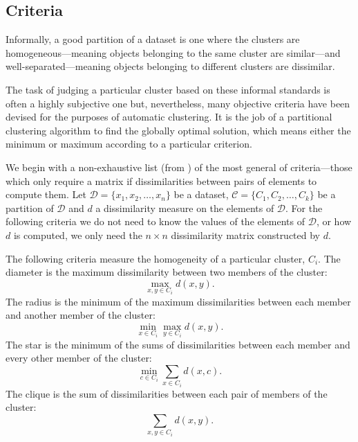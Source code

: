 \documentclass[a4paper]{report}
\newcommand{\dset}{\mathcal{D}}
\newcommand{\clus}{\mathcal{C}}
\begin{document}
\subsection{Criteria}
\label{sec:criteria}

Informally, a good partition of a dataset is one where the clusters are
homogeneous---meaning objects belonging to the same cluster are similar---and
well-separated---meaning objects belonging to different clusters are
dissimilar.

The task of judging a particular cluster based on these informal standards is
often a highly subjective one but, nevertheless, many objective criteria have
been devised for the purposes of automatic clustering.  It is the job of a
partitional clustering algorithm to find the globally optimal solution, which
means either the minimum or maximum according to a particular criterion.

We begin with a non-exhaustive list (from \citep{hansen1997mathprog}) of the
most general of criteria---those which only require a matrix if
dissimilarities between pairs of elements to compute them.  Let $\dset =
\{x_1,x_2,\dotsc,x_n\}$ be a dataset, $\clus = \{C_1,C_2,\dotsc,C_k\}$ be a
partition of $\dset$ and $d$ a dissimilarity measure on the elements of
$\dset$.  For the following criteria we do not need to know the values of the
elements of $\dset$, or how $d$ is computed, we only need the $n \times n$
dissimilarity matrix constructed by $d$.

The following criteria measure the homogeneity of a particular cluster,
$C_i$.  The diameter is the maximum dissimilarity between two members of the
cluster:
\begin{equation*}
  \max_{x,y \in C_i} d(x,y).
\end{equation*}
The radius is the minimum of the maximum dissimilarities between each member
and another member of the cluster:
\begin{equation*}
  \min_{x \in C_i} \max_{y \in C_i} d(x,y).
\end{equation*}
The star is the minimum of the sums of dissimilarities between each member
and every other member of the cluster:
\begin{equation*}
  \min_{c \in C_i} \sum_{x \in C_i} d(x,c).
\end{equation*}
The clique is the sum of dissimilarities between each pair of members of the
cluster:
\begin{equation*}
  \sum_{x,y \in C_i} d(x,y).
\end{equation*}
\end{document}
